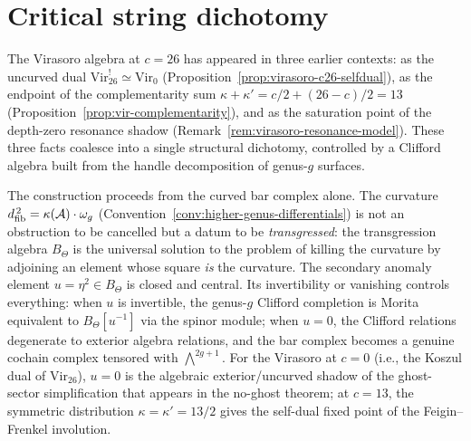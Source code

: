 
\section{Critical string dichotomy}
\label{sec:thqg-critical-string-dichotomy}

The Virasoro algebra at $c = 26$ has appeared in three earlier contexts:
as the uncurved dual $\mathrm{Vir}_{26}^! \simeq \mathrm{Vir}_0$
(Proposition~\ref{prop:virasoro-c26-selfdual}),
as the endpoint of the complementarity sum
$\kappa + \kappa' = c/2 + (26-c)/2 = 13$
(Proposition~\ref{prop:vir-complementarity}),
and as the saturation point of the depth-zero resonance shadow
(Remark~\ref{rem:virasoro-resonance-model}).
These three facts coalesce into a single structural dichotomy,
controlled by a Clifford algebra built from the handle
decomposition of genus-$g$ surfaces.

The construction proceeds from the curved bar complex alone.
The curvature $d_{\mathrm{fib}}^{\,2} = \kappa(\mathcal{A}) \cdot \omega_g$
(Convention~\ref{conv:higher-genus-differentials})
is not an obstruction to be cancelled but a datum to be \emph{transgressed}:
the transgression algebra $B_\Theta$ is the universal solution to the
problem of killing the curvature by adjoining an element whose square
\emph{is} the curvature. The secondary anomaly element
$u = \eta^2 \in B_\Theta$ is closed and central. Its invertibility or
vanishing controls everything: when $u$ is invertible, the genus-$g$
Clifford completion is Morita equivalent to $B_\Theta[u^{-1}]$ via the
spinor module; when $u = 0$, the Clifford relations degenerate to
exterior algebra relations, and the bar complex becomes a genuine cochain
complex tensored with $\bigwedge^{2g+1}$. For the Virasoro at $c = 0$
(i.e., the Koszul dual of $\mathrm{Vir}_{26}$),
$u = 0$ is the algebraic exterior/uncurved shadow of the ghost-sector
simplification that appears in the no-ghost theorem;
at $c = 13$, the symmetric distribution $\kappa = \kappa' = 13/2$ gives
the self-dual fixed point of the Feigin--Frenkel involution.

%
%

